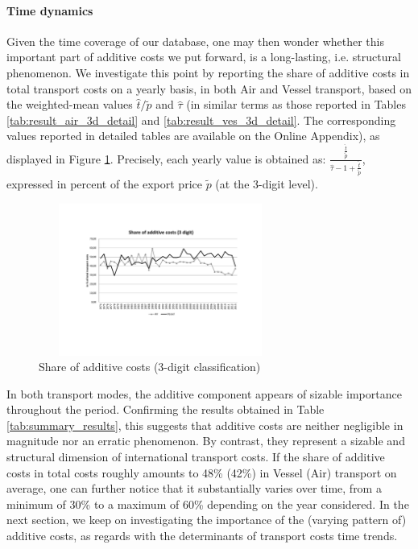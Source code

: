 \documentclass[a4paper,11pt]{article}
\begin{document}
\paragraph{Time dynamics} Given the time coverage of our database, one may then wonder whether this important part of additive costs we put forward, is a long-lasting, i.e. structural phenomenon.
We investigate this point by reporting the share of additive costs in total transport costs on a yearly basis, in both Air and Vessel transport, based on the weighted-mean values $\widehat{t}/\widetilde{p}$ and $\widehat{\tau}$ (in similar terms as those reported in Tables \ref{tab:result_air_3d_detail} and \ref{tab:result_ves_3d_detail}.
The corresponding values reported in detailed tables are available on the Online Appendix), as displayed in Figure \ref{fig:part_cout_additif}.
Precisely, each yearly value is obtained as: $\frac{\frac{\widehat{t}}{\widetilde{p}}}{\widehat{\tau}-1+\frac{\widehat{t}}{\widetilde{p}}}$, expressed in percent of the export price $\widetilde{p}$ (at the 3-digit level).

\begin{figure}[htbp]
\caption{Share of additive costs (3-digit classification)}
\label{fig:part_cout_additif}
\begin{center}
\includegraphics[width=8cm, height=5cm]{part_cout_additif.pdf}
\end{center}
\end{figure}


In both transport modes, the additive component appears of sizable importance throughout the period.
Confirming the results obtained in Table \ref{tab:summary_results}, this suggests that additive costs are neither negligible in magnitude nor an erratic phenomenon.
By contrast, they represent a sizable and structural dimension of international transport costs.
If the share of additive costs in total costs roughly amounts to 48\% (42\%) in Vessel (Air) transport on average, one can further notice that it substantially varies over time, from a minimum of 30\% to a maximum of 60\% depending on the year considered.
In the next section, we keep on investigating the importance of the (varying pattern of) additive costs, as regards with the determinants of transport costs time trends.
\end{document}
